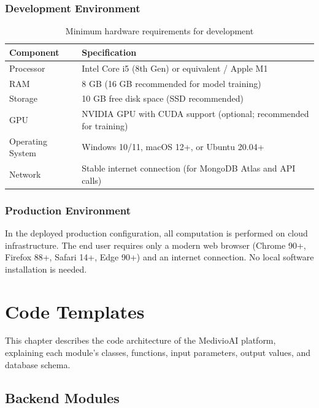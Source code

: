 \documentclass[12pt, a4paper, oneside]{report}
\begin{document}
\subsection{Development Environment}

\begin{table}[H]
\centering
\caption{Minimum hardware requirements for development}
\label{tab:hw_dev}
\begin{tabular}{lp{8cm}}
\toprule
\textbf{Component} & \textbf{Specification} \\
\midrule
Processor & Intel Core i5 (8th Gen) or equivalent / Apple M1 \\
RAM & 8 GB (16 GB recommended for model training) \\
Storage & 10 GB free disk space (SSD recommended) \\
GPU & NVIDIA GPU with CUDA support (optional; recommended for training) \\
Operating System & Windows 10/11, macOS 12+, or Ubuntu 20.04+ \\
Network & Stable internet connection (for MongoDB Atlas and API calls) \\
\bottomrule
\end{tabular}
\end{table}

\subsection{Production Environment}

In the deployed production configuration, all computation is performed on cloud infrastructure. The end user requires only a modern web browser (Chrome 90+, Firefox 88+, Safari 14+, Edge 90+) and an internet connection. No local software installation is needed.

\chapter{Code Templates}
\label{chap:code}

This chapter describes the code architecture of the MedivioAI platform, explaining each module's classes, functions, input parameters, output values, and database schema.

\section{Backend Modules}
\label{sec:backend_modules}
\end{document}
